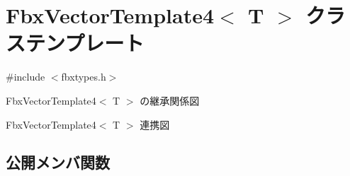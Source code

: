 \hypertarget{class_fbx_vector_template4}{}\section{Fbx\+Vector\+Template4$<$ T $>$ クラステンプレート}
\label{class_fbx_vector_template4}


{\ttfamily \#include $<$fbxtypes.\+h$>$}



Fbx\+Vector\+Template4$<$ T $>$ の継承関係図


Fbx\+Vector\+Template4$<$ T $>$ 連携図
\subsection*{公開メンバ関数}
